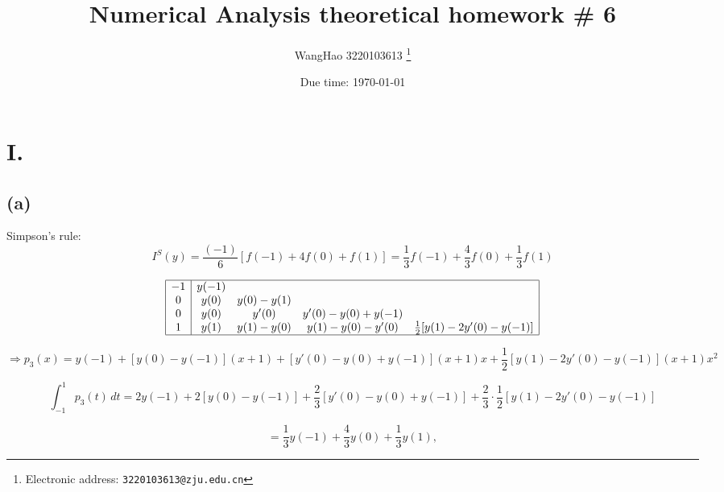 \documentclass[a4paper]{article}
\begin{document}
\title{Numerical Analysis theoretical homework \# 6}

\author{WangHao 3220103613
  \thanks{Electronic address: \texttt{3220103613@zju.edu.cn}}}


\date{Due time: \today}

\maketitle
\section*{I.}

\subsection*{(a)}

Simpson's rule:
\begin{equation*}
I^S(y) = \frac{(-1)}{6} \left[ f(-1) + 4f(0) + f(1) \right] = \frac{1}{3} f(-1) + \frac{4}{3} f(0) + \frac{1}{3} f(1)
\end{equation*}

\[
\begin{array}{|c|cccc|}
\hline
-1 & y(-1) &  &  & \\
0 & y(0) & y(0)-y(1) & & \\
0 & y(0) & y'(0) & y'(0)-y(0)+y(-1) & \\
1 & y(1) & y(1)-y(0) & y(1)-y(0)-y'(0) & \frac{1}{2}[y(1)-2y'(0)-y(-1)]\\
\hline
\end{array}
\]

\begin{equation*}
\Rightarrow p_3(x) = y(-1) + [y(0) - y(-1)](x + 1) + [y'(0) - y(0) + y(-1)](x + 1)x + \frac{1}{2} [y(1) - 2y'(0) - y(-1)](x + 1)x^2
\end{equation*}

\begin{equation*}
\int_{-1}^{1} p_3(t) \, dt = 2y(-1) + 2[y(0) - y(-1)] + \frac{2}{3} [y'(0) - y(0) + y(-1)] + \frac{2}{3} \cdot \frac{1}{2} [y(1) - 2y'(0) - y(-1)]
\end{equation*}

\begin{equation*}
= \frac{1}{3} y(-1) + \frac{4}{3} y(0) + \frac{1}{3} y(1),
\end{equation*}
\end{document}
